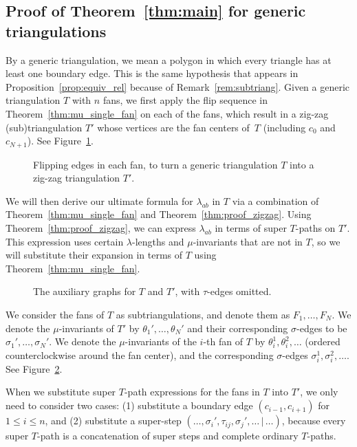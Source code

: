 \subsection{Proof of Theorem~\ref{thm:main} for generic triangulations}
By a generic triangulation, we mean a polygon in which every triangle has at least one boundary edge. This is the same hypothesis that appears in Proposition~\ref{prop:equiv_rel} because of Remark~\ref{rem:subtriang}. Given a generic triangulation $T$ with $n$ fans, we first apply the flip sequence in Theorem~\ref{thm:mu_single_fan} on each of the fans,
which result in a zig-zag (sub)triangulation $T'$ whose vertices are the fan centers of~$T$ (including $c_0$ and $c_{N+1}$). See Figure~\ref{fig:main_flip_sequence}.

\begin{figure}[h]
\centering

\caption{Flipping edges in each fan, to turn a generic triangulation $T$ into a zig-zag triangulation $T'$.}\label{fig:main_flip_sequence}
\end{figure}

We will then derive our ultimate formula for $\lambda_{ab}$ in $T$ via a combination of Theorem~\ref{thm:mu_single_fan} and Theorem~\ref{thm:proof_zigzag}.
Using Theorem~\ref{thm:proof_zigzag}, we can express $\lambda_{ab}$ in terms of super $T$-paths on $T'$.
This expression uses certain $\lambda$-lengths and $\mu$-invariants that are not in $T$, so we will substitute their expansion
in terms of $T$ using Theorem~\ref{thm:mu_single_fan}.

\begin{figure}[h]

\caption{The auxiliary graphs for $T$ and $T'$, with $\tau$-edges omitted.}\label{fig:main_flip_sequence_labelled}
\end{figure}

We consider the fans of $T$ as subtriangulations, and denote them as $F_1,\dots,F_N$.
We denote the $\mu$-invariants of $T'$ by $\theta_1',\dots,\theta_N'$ and their corresponding $\sigma$-edges to be $\sigma_1',\dots,\sigma_N'$.
We denote the $\mu$-invariants of the $i$-th fan of $T$ by $\theta_i^1,\theta_i^2,\dots$ (ordered counterclockwise around the fan center),
and the corresponding $\sigma$-edges $\sigma_i^1,\sigma_i^2,\dots$. See Figure~\ref{fig:main_flip_sequence_labelled}.

When we substitute super $T$-path expressions for the fans in $T$ into $T'$, we only need to consider two cases:
(1) substitute a boundary edge $(c_{i-1},c_{i+1})$ for $1\leqslant i\leqslant n$,
and (2) substitute a super-step $(\dots,\sigma_i',\tau_{ij},\sigma_j',\dots\,|\,\dots)$,
because every super $T$-path is a concatenation of super steps and complete ordinary $T$-paths.

